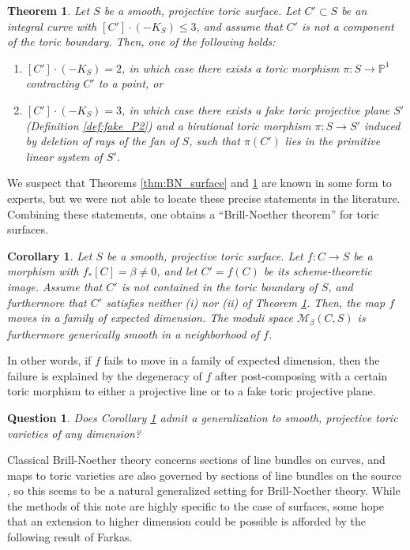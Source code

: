 \documentclass[12pt]{amsart}
\def\cM{{\mathcal{M}}}
\def\P{\mathbb{P}}
\newtheorem{theorem}[definition]{Theorem}
\newtheorem{corollary}[definition]{Corollary}
\newtheorem{question}[definition]{Question}
\begin{document}
\begin{theorem}\label{thm:toric_low_degree}
Let $S$ be a smooth, projective toric surface. Let $C'\subset S$ be an integral curve with $[C']\cdot (-K_S)\le 3$, and assume that $C'$ is not a component of the toric boundary. Then, one of the following holds:
\begin{enumerate}
    \item[(i)] $[C']\cdot (-K_S)=2$, in which case there exists a toric morphism $\pi:S\to \P^1$ contracting $C'$ to a point, or
    \item[(ii)] $[C']\cdot (-K_S)=3$, in which case there exists a \emph{fake toric projective plane} $S'$ (Definition \ref{def:fake_P2}) and a birational toric morphism $\pi:S\to S'$ induced by deletion of rays of the fan of $S$, such that $\pi(C')$ lies in the primitive linear system of $S'$.
\end{enumerate}
\end{theorem}

We suspect that Theorems \ref{thm:BN_surface} and \ref{thm:toric_low_degree} are known in some form to experts, but we were not able to locate these precise statements in the literature. Combining these statements, one obtains a ``Brill-Noether theorem'' for toric surfaces.

\begin{corollary}\label{cor:BN_toric_surface}
Let $S$ be a smooth, projective toric surface. Let $f:C\to S$ be a morphism with $f_{*}[C]=\beta\neq0$, and let $C'=f(C)$ be its scheme-theoretic image. Assume that $C'$ is not contained in the toric boundary of $S$, and furthermore that $C'$ satisfies neither (i) nor (ii) of Theorem \ref{thm:toric_low_degree}. Then, the map $f$ moves in a family of expected dimension. The moduli space $\cM_\beta(C,S)$ is furthermore generically smooth in a neighborhood of $f$.
\end{corollary}

In other words, if $f$ fails to move in a family of expected dimension, then the failure is explained by the degeneracy of $f$ after post-composing with a certain toric morphism to either a projective line or to a fake toric projective plane.

\begin{question}\label{question:higher_dim}
    Does Corollary \ref{cor:BN_toric_surface} admit a generalization to smooth, projective toric varieties of any dimension?
\end{question}

Classical Brill-Noether theory concerns sections of line bundles on curves, and maps to toric varieties are also governed by sections of line bundles on the source \cite{cox}, so this seems to be a natural generalized setting for Brill-Noether theory. While the methods of this note are highly specific to the case of surfaces, some hope that an extension to higher dimension could be possible is afforded by the following result of Farkas.
\end{document}
